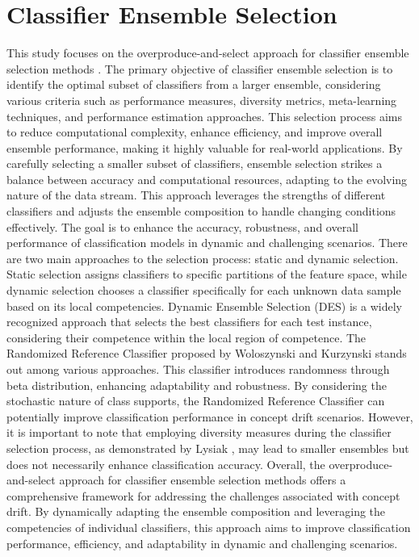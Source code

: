 %
%
\section{Classifier Ensemble Selection}

\label{sec:3_2_ensemble}
This study focuses on the overproduce-and-select approach for classifier ensemble selection methods \cite{cruz2017meta}\cite{kuncheva2000clustering}\cite{jackowski2014improved}. The primary objective of classifier ensemble selection is to identify the optimal subset of classifiers from a larger ensemble, considering various criteria such as performance measures, diversity metrics, meta-learning techniques, and performance estimation approaches. This selection process aims to reduce computational complexity, enhance efficiency, and improve overall ensemble performance, making it highly valuable for real-world applications. By carefully selecting a smaller subset of classifiers, ensemble selection strikes a balance between accuracy and computational resources, adapting to the evolving nature of the data stream. This approach leverages the strengths of different classifiers and adjusts the ensemble composition to handle changing conditions effectively. The goal is to enhance the accuracy, robustness, and overall performance of classification models in dynamic and challenging scenarios. There are two main approaches to the selection process: static and dynamic selection. Static selection assigns classifiers to specific partitions of the feature space, while dynamic selection chooses a classifier specifically for each unknown data sample based on its local competencies. Dynamic Ensemble Selection (DES) is a widely recognized approach that selects the best classifiers for each test instance, considering their competence within the local region of competence. The Randomized Reference Classifier proposed by Woloszynski and Kurzynski \cite{woloszynski2011probabilistic} stands out among various approaches. This classifier introduces randomness through beta distribution, enhancing adaptability and robustness. By considering the stochastic nature of class supports, the Randomized Reference Classifier can potentially improve classification performance in concept drift scenarios. However, it is important to note that employing diversity measures during the classifier selection process, as demonstrated by Lysiak \cite{lysiak2014optimal}, may lead to smaller ensembles but does not necessarily enhance classification accuracy. Overall, the overproduce-and-select approach for classifier ensemble selection methods offers a comprehensive framework for addressing the challenges associated with concept drift. By dynamically adapting the ensemble composition and leveraging the competencies of individual classifiers, this approach aims to improve classification performance, efficiency, and adaptability in dynamic and challenging scenarios.